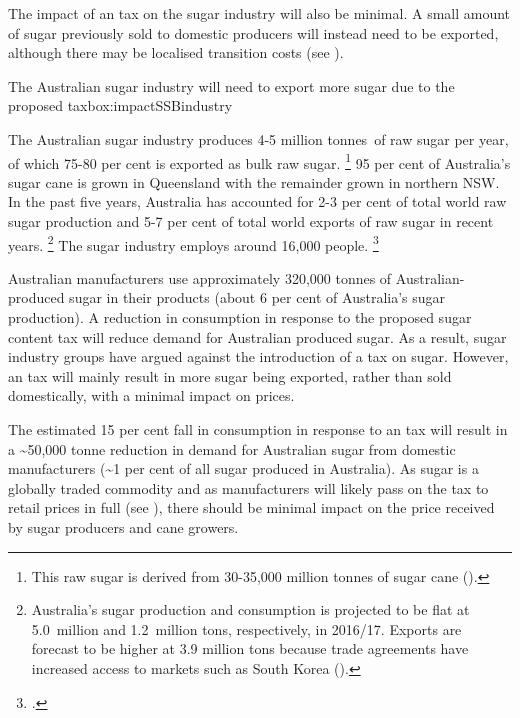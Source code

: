 \documentclass[embargoed]{grattan}
\begin{document}
The impact of an \SSB{} tax on the sugar industry will also be minimal. A small amount of sugar previously sold to domestic \SSB{} producers will instead need to be exported, although there may be localised transition costs (see ).

\begin{bigbox*}{The Australian sugar industry will need to export more sugar due to the proposed \SSB{} tax}{box:impactSSBindustry}

The Australian sugar industry produces 4-5 million tonnes~of raw sugar per year, of which 75-80 per cent is exported as bulk raw sugar.%
\footnote{This raw sugar is derived from 30-35,000 million tonnes of sugar cane (\textcites{Canegrowers2015Statisticsfacts}{Agriculture2016SugarWorldMarkets}{Council2016Sugarcanestatistics}).} 95 per cent of Australia's sugar cane is grown in Queensland with the remainder grown in northern NSW.
In the past five years, Australia has accounted for 2-3 per cent of total world raw sugar production and 5-7 per cent of total world exports of raw sugar in recent years.%
\footnote{Australia's sugar production and consumption is projected to be flat at 5.0~million and 1.2~million tons, respectively, in 2016/17.
Exports are forecast to be higher at 3.9 million tons because trade agreements have increased access to markets such as South Korea (\textcite{Agriculture2016SugarWorldMarkets}).} The sugar industry employs around 16,000 people.%
\footcite{Council2016Sugarcanestatistics}

Australian \SSB{} manufacturers use approximately 320,000 tonnes of Australian-produced sugar in their products (about 6 per cent of Australia's sugar production).
A reduction in \SSB{} consumption in response to the proposed sugar content \SSB{} tax will reduce demand for Australian produced sugar.
As a result, sugar industry groups have argued against the introduction of a tax on sugar.
However, an \SSB{} tax will mainly result in more sugar being exported, rather than sold domestically, with a minimal impact on prices.

The estimated 15 per cent fall in \SSB{} consumption in response to an \SSB{} tax will result in a \textasciitilde{}50,000 tonne reduction in demand for Australian sugar from domestic \SSB{} manufacturers (\textasciitilde{}1 per cent of all sugar produced in Australia).
As sugar is a globally traded commodity and as manufacturers will likely pass on the \SSB{} tax to retail prices in full (see ), there should be minimal impact on the price received by sugar producers and cane growers.


\end{bigbox*}
\end{document}
